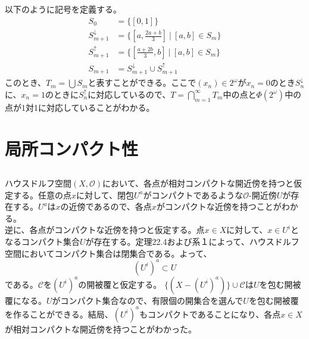 \documentclass{jsarticle}
\begin{document}
\subsection{}
以下のように記号を定義する。
\begin{align*}
S_0&=\{[0,1]\}\\
S_{m+1}^{\downarrow}&=\{[a,\frac{2a+b}{3}]\ |\ [a,b]\in S_m\}\\
S_{m+1}^{\uparrow}&=\{[\frac{a+2b}{3},b]\ |\ [a,b]\in S_m\}\\
S_{m+1}&=S_{m+1}^{\downarrow}\cup S_{m+1}^{\uparrow}
\end{align*}
このとき、$T_m=\bigcup S_m$と表すことができる。ここで$(x_n)\in 2^\omega$が$x_n=0$のとき$S_n^\downarrow$に、$x_n=1$のときに$S_n^\uparrow$に対応しているので、$T=\bigcap_{m=1}^\infty T_m$中の点と$\Phi(2^\omega)$中の点が1対1に対応していることがわかる。





\section{局所コンパクト性}

\subsection{}
ハウスドルフ空間$(X,\mathcal{O})$において、各点が相対コンパクトな開近傍を持つと仮定する。任意の点$x$に対して、閉包$U^{a}$がコンパクトであるような$\mathcal{O}$-開近傍$U$が存在する。$U^{a}$は$x$の近傍であるので、各点$x$がコンパクトな近傍を持つことがわかる。\\
逆に、各点がコンパクトな近傍を持つと仮定する。点$x\in X$に対して、$x\in U^{i}$となるコンパクト集合$U$が存在する。定理22.4および系１によって、ハウスドルフ空間においてコンパクト集合は閉集合である。よって、
\[(U^i)^a\subset U\]
である。$\mathcal{C}$を$(U^i)^a$の開被覆と仮定する。
$\{(X-(U^i)^a)\}\cup\mathcal{C}$は$U$を包む開被覆になる。$U$がコンパクト集合なので、有限個の開集合を選んで$U$を包む開被覆を作ることができる。結局、$(U^i)^a$もコンパクトであることになり、各点$x\in X$が相対コンパクトな開近傍を持つことがわかった。


\end{document}
